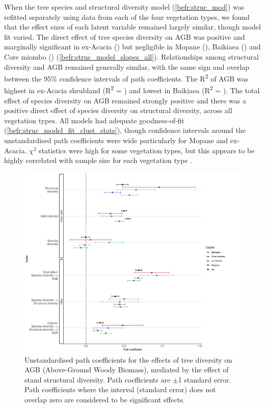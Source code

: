 \begin{refsection}
When the tree species and structural diversity model (\autoref{befr:struc_mod}) was refitted separately using data from each of the four vegetation types, we found that the effect sizes of each latent variable remained largely similar, though model fit varied. The direct effect of tree species diversity on AGB was positive and marginally significant in ex-Acacia (\strucbetacsb{}) but negligible in Mopane (\strucbetadsb{}), Baikiaea (\strucbetaasb{}) and Core miombo (\strucbetabsb{}) (\autoref{befr:struc_model_slopes_all}). Relationships among structural diversity and AGB remained generally similar, with the same sign and overlap between the 95\% confidence intervals of path coefficients. The R\textsuperscript{2} of AGB was highest in ex-Acacia shrubland (R\textsuperscript{2} = \struccrsq{}) and lowest in Baikiaea (R\textsuperscript{2} = \strucarsq{}). The total effect of species diversity on AGB remained strongly positive and there was a positive direct effect of species diversity on structural diversity, across all vegetation types. All models had adequate goodness-of-fit (\autoref{befr:struc_model_fit_clust_stats}), though confidence intervals around the unstandardised path coefficients were wide particularly for Mopane and ex-Acacia. $\chi^{2}$ statistics were high for some vegetation types, but this appears to be highly correlated with sample size for each vegetation type \citep{Hooper2008}.

\begin{figure}
	\includegraphics[width=\linewidth]{img/struc_model_slopes_all}
	\caption[Path coefficients for vegetation type model]{Unstandardised path coefficients for the effects of tree diversity on AGB (Above-Ground Woody Biomass), mediated by the effect of stand structural diversity. Path coefficients are $\pm$1 standard error. Path coefficients where the interval (standard error) does not overlap zero are considered to be significant effects.}
	\label{befr:struc_model_slopes_all}
\end{figure}


\end{refsection}
